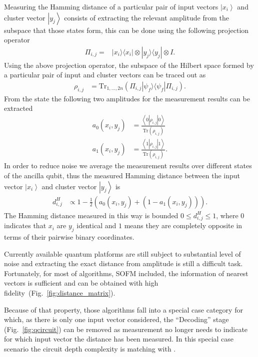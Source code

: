 \documentclass[pra,showkeys,twocolumn,showpacs]{revtex4-1}
\begin{document}
Measuring the Hamming distance of a particular pair of input vectors $\left| x_i \right\rangle$ and cluster vector $\left| y_j \right\rangle$ consists of extracting the relevant amplitude from the subspace that those states form, 
this can be done using the following projection operator
%
\begin{align}
\Pi_{i,j} = &\left| x_i \rangle\langle x_i \right| \otimes \left| y_j \rangle\langle y_j \right| \otimes I .
\end{align} 
%
Using the above projection operator, the subspace of the Hilbert space formed by a particular pair of input and cluster vectors can be traced out as
%
\begin{align}
    \rho_{i,j} &= \text{Tr}_{1,\dots,2n} (\Pi_{i,j} \left| \psi_f \rangle\langle \psi_f \right| \Pi_{i,j}) .
\end{align}
%
From the state the following two amplitudes for the measurement results can be extracted
%
\begin{align}
    a_0(x_i,y_j) & = \frac{\left\langle 0 |\rho_{i,j}| 0 \right\rangle}{\text{Tr}(\rho_{i,j})}  \\
    a_1(x_i,y_j) & = \frac{\left\langle 1 |\rho_{i,j}| 1 \right\rangle}{\text{Tr}(\rho_{i,j})} .
\end{align}
%
In order to reduce noise we average the measurement results over different states of the ancilla qubit, 
thus the measured Hamming distance between the input vector $\left| x_i \right\rangle$ and cluster vector $\left| y_j \right\rangle$ is
%
\begin{align}
    d_{i,j}^H & \propto 1 - \frac{1}{2}(a_0(x_i,y_j) + (1-a_1(x_i,y_j))) .
\end{align}
%
The Hamming distance measured in this way is bounded $0 \leq d_{i,j}^H \leq 1$, 
where  $0$ indicates that $x_i$ are $y_j$ identical and $1$ means they are completely opposite in terms of their pairwise binary coordinates.

Currently available quantum platforms are still subject to substantial level of noise and extracting the exact distance from amplitude is still a difficult task.
Fortunately, for most of algorithms, SOFM included, the information of nearest vectors is sufficient 
and can be obtained with high fidelity~(Fig.~\ref{fig:distance_matrix}).

Because of that property, those algorithms fall into a special case category for which, as there is only one input vector considered, the ``Decoding'' stage (Fig.~\ref{fig:qcircuit}) can be removed as measurement no longer needs to indicate for which input vector the distance has been measured.
In this special case scenario the circuit depth complexity is matching with \cite{schuld2014}.
\end{document}
